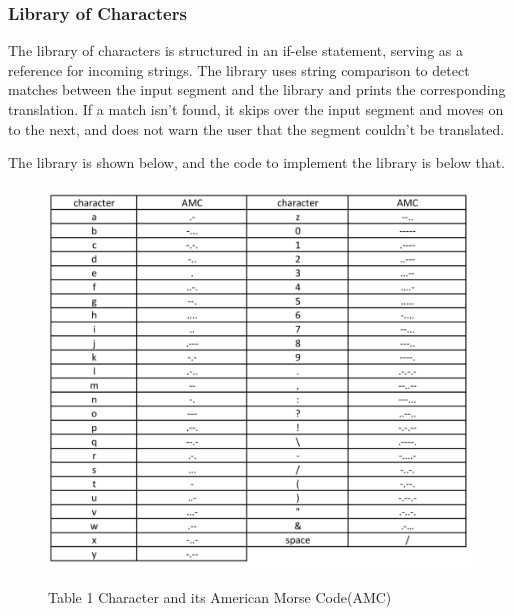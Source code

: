 \documentclass[12pt]{article}
\begin{document}
\FloatBarrier

\subsubsection{Library of Characters}
The library of characters is structured in an if-else statement, serving as a reference for incoming strings. The library uses string comparison to detect matches between the input segment and the library and prints the corresponding translation. If a match isn't found, it skips over the input segment and moves on to the next, and does not warn the user that the segment couldn't be translated.

The library is shown below, and the code to implement the library is below that.
\begin{figure}
    \centering
    \caption{Table 1 Character and its American Morse Code(AMC)}
    \includegraphics[width=6 in]{images/table-1.png}
    \label{fig:AMCtable}
\end{figure}
\\ \\ \\ \\
\end{document}
